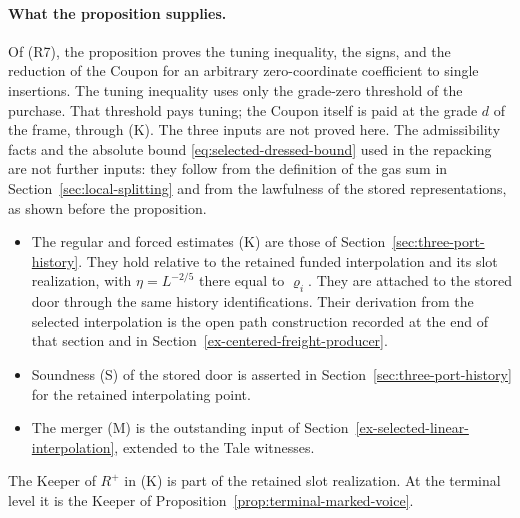\paragraph{What the proposition supplies.}
Of (R7), the proposition proves the tuning inequality, the signs, and
the reduction of the Coupon for an arbitrary zero-coordinate
coefficient to single insertions. The tuning inequality uses only the
grade-zero threshold of the purchase. That threshold pays tuning; the
Coupon itself is paid at the grade $d$ of the frame, through (K). The
three inputs are not proved here. The admissibility facts and the
absolute bound \eqref{eq:selected-dressed-bound} used in the repacking
are not further inputs: they follow from the definition of the gas sum
in Section~\ref{sec:local-splitting} and from the lawfulness of the
stored representations, as shown before the proposition.
\begin{itemize}
\item The regular and forced estimates (K) are those of
  Section~\ref{sec:three-port-history}. They hold relative to the
  retained funded interpolation and its slot realization, with
  $\eta=L^{-2/5}$ there equal to $\varrho_i$. They are attached to the
  stored door through the same history identifications. Their
  derivation from the selected interpolation is the open path
  construction recorded at the end of that section and in
  Section~\ref{ex-centered-freight-producer}.
\item Soundness (S) of the stored door is asserted in
  Section~\ref{sec:three-port-history} for the retained interpolating
  point.
\item The merger (M) is the outstanding input of
  Section~\ref{ex-selected-linear-interpolation}, extended to the Tale
  witnesses.
\end{itemize}
The Keeper of $R^+$ in (K) is part of the retained slot realization.
At the terminal level it is the Keeper of
Proposition~\ref{prop:terminal-marked-voice}.
